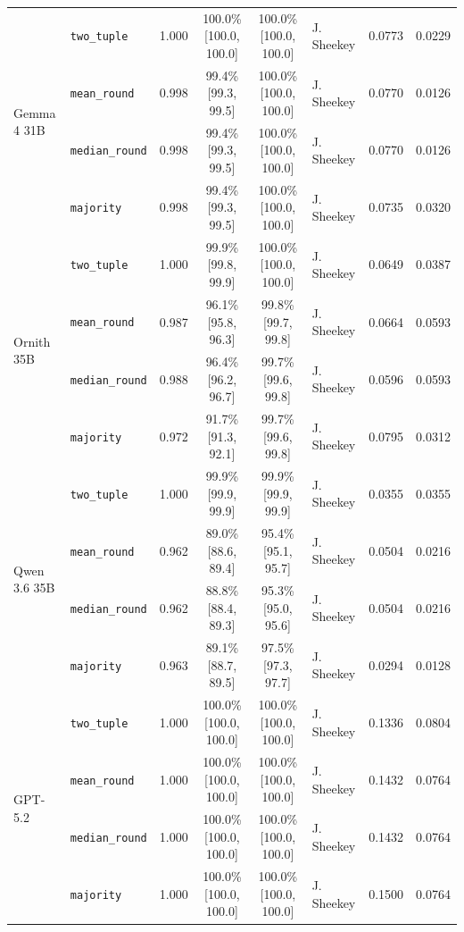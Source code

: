 \begin{table}[htbp]
\begin{tabular}{llccclrr}
\midrule
  \multirow{4}{*}{Gemma 4 31B} & \texttt{two\_tuple} & 1.000 & 100.0\% \tiny[100.0, 100.0] & 100.0\% \tiny[100.0, 100.0] & J. Sheekey & 0.0773 & 0.0229 \\
   & \texttt{mean\_round} & 0.998 & 99.4\% \tiny[99.3, 99.5] & 100.0\% \tiny[100.0, 100.0] & J. Sheekey & 0.0770 & 0.0126 \\
   & \texttt{median\_round} & 0.998 & 99.4\% \tiny[99.3, 99.5] & 100.0\% \tiny[100.0, 100.0] & J. Sheekey & 0.0770 & 0.0126 \\
   & \texttt{majority} & 0.998 & 99.4\% \tiny[99.3, 99.5] & 100.0\% \tiny[100.0, 100.0] & J. Sheekey & 0.0735 & 0.0320 \\
\midrule
  \multirow{4}{*}{Ornith 35B} & \texttt{two\_tuple} & 1.000 & 99.9\% \tiny[99.8, 99.9] & 100.0\% \tiny[100.0, 100.0] & J. Sheekey & 0.0649 & 0.0387 \\
   & \texttt{mean\_round} & 0.987 & 96.1\% \tiny[95.8, 96.3] & 99.8\% \tiny[99.7, 99.8] & J. Sheekey & 0.0664 & 0.0593 \\
   & \texttt{median\_round} & 0.988 & 96.4\% \tiny[96.2, 96.7] & 99.7\% \tiny[99.6, 99.8] & J. Sheekey & 0.0596 & 0.0593 \\
   & \texttt{majority} & 0.972 & 91.7\% \tiny[91.3, 92.1] & 99.7\% \tiny[99.6, 99.8] & J. Sheekey & 0.0795 & 0.0312 \\
\midrule
  \multirow{4}{*}{Qwen 3.6 35B} & \texttt{two\_tuple} & 1.000 & 99.9\% \tiny[99.9, 99.9] & 99.9\% \tiny[99.9, 99.9] & J. Sheekey & 0.0355 & 0.0355 \\
   & \texttt{mean\_round} & 0.962 & 89.0\% \tiny[88.6, 89.4] & 95.4\% \tiny[95.1, 95.7] & J. Sheekey & 0.0504 & 0.0216 \\
   & \texttt{median\_round} & 0.962 & 88.8\% \tiny[88.4, 89.3] & 95.3\% \tiny[95.0, 95.6] & J. Sheekey & 0.0504 & 0.0216 \\
   & \texttt{majority} & 0.963 & 89.1\% \tiny[88.7, 89.5] & 97.5\% \tiny[97.3, 97.7] & J. Sheekey & 0.0294 & 0.0128 \\
\midrule
  \multirow{4}{*}{GPT-5.2} & \texttt{two\_tuple} & 1.000 & 100.0\% \tiny[100.0, 100.0] & 100.0\% \tiny[100.0, 100.0] & J. Sheekey & 0.1336 & 0.0804 \\
   & \texttt{mean\_round} & 1.000 & 100.0\% \tiny[100.0, 100.0] & 100.0\% \tiny[100.0, 100.0] & J. Sheekey & 0.1432 & 0.0764 \\
   & \texttt{median\_round} & 1.000 & 100.0\% \tiny[100.0, 100.0] & 100.0\% \tiny[100.0, 100.0] & J. Sheekey & 0.1432 & 0.0764 \\
   & \texttt{majority} & 1.000 & 100.0\% \tiny[100.0, 100.0] & 100.0\% \tiny[100.0, 100.0] & J. Sheekey & 0.1500 & 0.0764 \\
\bottomrule
\end{tabular}
\end{table}
